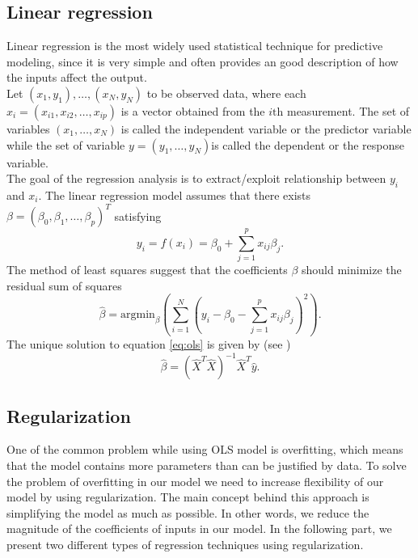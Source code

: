\documentclass [11pt]{article}
\begin{document}
\subsection{Linear regression}
Linear regression is the most widely used statistical technique for predictive modeling, since it is very simple and often provides an good description of how the inputs affect the output.\\
Let $(x_{1},y_{1}),\ldots,(x_{N},y_{N})$ to be observed data, where each $x_{i} = (x_{i1},x_{i2},\ldots,x_{i p})$ is a vector obtained from the $i\text{th}$ measurement. The set of variables $(x_{1},\ldots,x_{N})$ is called the independent variable or the predictor variable while the set of variable $y=(y_{1},\ldots,y_{N})$is called the dependent or the response variable. \\
The goal of the regression analysis is to extract/exploit relationship between $y_i$ and $x_i$. The linear regression model assumes that there exists $\beta=(\beta_{0},\beta_{1},\ldots,\beta_{p})^{T}$ satisfying 
\begin{equation}
y_{i}=f(x_{i})=\beta_{0} + \sum_{j=1}^{p}x_{ij}\beta_{j}.
\end{equation}
The method of least squares suggest that the coefficients $\beta$ should minimize the residual sum of squares
\begin{equation}
\hat{\beta}=\text{argmin}_{\beta} ( \sum_{i=1}^{N}(y_{i}- \beta_{0}- \sum_{j=1}^{p}x_{ij}\beta_{j})^{2}).
\label{eq:ols}
\end{equation}
The unique solution to equation \eqref{eq:ols} is given by (see \cite{def})
\begin{equation}
\hat{\beta} =\left(\hat{X}^T\hat{X}\right)^{-1}\hat{X}^T\hat{y}.
\end{equation}

\subsection{Regularization}
One of the common problem while using OLS model is overfitting, which means that the model contains more parameters than can be justified by data. To solve the problem of overfitting in our model we need to increase flexibility of our model by using regularization. The main concept behind this approach is simplifying the model as much as possible. In other words, we reduce the magnitude of the coefficients of inputs in our model. In the following part, we present two different types of regression techniques using regularization.
\end{document}
